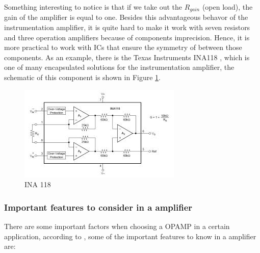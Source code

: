 	Something interesting to notice is that if we take out the $R_{gain}$ (open load), the gain of the amplifier is equal to one. Besides this advantageous behavor of the instrumentation amplifier, it is quite hard to make it work with seven resistors and three operation amplifiers because of components imprecision. Hence, it is more practical to work with ICs that ensure the symmetry of between those components. As an example, there is the Texas Instruments INA118 \cite{ina118}, which is one of many encapsulated solutions for the instrumentation amplifier, the schematic of this component is shown in Figure \ref{fig:ina118}.

	\begin{figure}[htbp]
		\centering
			\includegraphics[scale=1.4]{figuras/fig-ina118}
		\caption{INA 118 \cite{schematic-ina118}}
		\label{fig:ina118}
	\end{figure}

	\subsubsection{Important features to consider in a amplifier}\label{sssec:important-features-to-consider-in-a-amplifier}

		There are some important factors when choosing a OPAMP in a certain application, according to \cite{analog2011operational}, some of the important features to know in a amplifier are:

